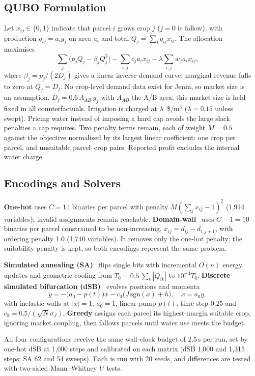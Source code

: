 \subsection{QUBO Formulation}

Let $x_{ij}\in\{0,1\}$ indicate that parcel $i$ grows crop $j$ ($j=0$ is
fallow), with production $q_{ij}=a_iy_j$ on area $a_i$ and total
$Q_j=\sum_iq_{ij}x_{ij}$. The allocation maximises
\begin{equation}
\sum_j\big(p_jQ_j-\beta_jQ_j^2\big)-\sum_{i,j}c_ja_ix_{ij}
-\lambda\sum_{i,j}w_ja_ix_{ij},
\end{equation}
where $\beta_j=p_j/(2D_j)$ gives a linear inverse-demand curve: marginal
revenue falls to zero at $Q_j=D_j$. No crop-level demand data exist for Jenin,
so market size is an assumption, $D_j=0.6\,A_{AB}\,y_j$ with $A_{AB}$ the A/B
area; this market size is held fixed in all counterfactuals. Irrigation is
charged at $\lambda$~\$/m$^3$ ($\lambda=0.15$ unless swept). Pricing water
instead of imposing a hard cap avoids the large slack penalties a cap requires.
Two penalty terms remain, each of weight $M=0.5$ against the objective
normalised by its largest linear coefficient: one crop per parcel, and
unsuitable parcel--crop pairs. Reported profit excludes the internal water
charge.

\subsection{Encodings and Solvers}

\textbf{One-hot} uses $C=11$ binaries per parcel with penalty
$M(\sum_jx_{ij}-1)^2$ (1{,}914 variables); invalid assignments remain
reachable. \textbf{Domain-wall}~\cite{chancellor2019} uses $C-1=10$ binaries
per parcel constrained to be non-increasing, $x_{ij}=d_{ij}-d_{i,j+1}$, with
ordering penalty 1.0 (1{,}740 variables). It removes only the one-hot penalty;
the suitability penalty is kept, so both encodings represent the same problem.

\textbf{Simulated annealing (SA)}~\cite{kirkpatrick1983} flips single bits with
incremental $O(n)$ energy updates and geometric cooling from
$T_0=0.5\,\overline{\sum_k|Q_{ik}|}$ to $10^{-4}T_0$. \textbf{Discrete
simulated bifurcation (dSB)}~\cite{goto2021} evolves positions and momenta
\begin{equation}
\dot y=-\big(a_0-p(t)\big)x-c_0\big(J\,\mathrm{sgn}(x)+h\big),\quad\dot x=a_0y,
\end{equation}
with inelastic walls at $|x|=1$, $a_0=1$, linear pump $p(t)$, time step 0.25
and $c_0=0.5/(\sqrt N\sigma_J)$. \textbf{Greedy} assigns each parcel its
highest-margin suitable crop, ignoring market coupling, then fallows parcels
until water use meets the budget.

All four configurations receive the same wall-clock budget of 2.5\,s per run,
set by one-hot dSB at 1{,}000 steps and calibrated on each matrix (dSB 1{,}000
and 1{,}315 steps; SA 62 and 54 sweeps). Each is run with 20 seeds, and
differences are tested with two-sided Mann--Whitney $U$ tests.


